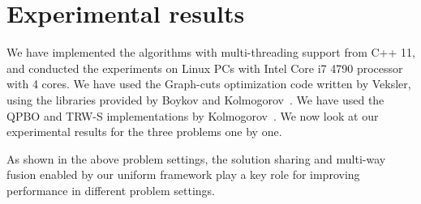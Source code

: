 \section{Experimental results}
\label{section:results} We have implemented the algorithms with
multi-threading support from C++ 11, and conducted the experiments on
Linux PCs with Intel Core i7 4790 processor with 4 cores. We have used
the Graph-cuts optimization code written by Veksler, using the libraries
provided by Boykov and
Kolmogorov~\cite{middlebury_mrf,alpha_expansion,what_energy_can_be_min_by_gc,mrf_experimental}.
%
%
We have used the QPBO and TRW-S implementations by
Kolmogorov~\cite{QPBO, TRW-S_implementation}. We now look at our
experimental results for the three problems one by one.








As shown in the above problem settings, the solution sharing and multi-way fusion enabled by our uniform framework play a key role for improving performance in different problem settings.
